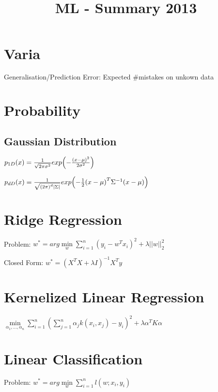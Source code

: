 \documentclass[11pt,twocolumn]{article}
\begin{document}
\title{ML - Summary 2013}



\section{Varia}

Generalisation/Prediction Error: Expected \#mistakes on unkown data


\section{Probability}

\subsection{Gaussian Distribution}

$p_{1D}(x) = {1 \over {\sqrt{2 \pi \sigma^2}}} exp{\left( -{{\left(x - \mu\right)^2} \over{2 \sigma^2}} \right)}$


$p_{dD}(x) = {1 \over {\sqrt{{(2 \pi)}^d |\Sigma|}}} exp{\left( -{ {1 \over 2}  {\left(x - \mu\right)^T} \Sigma^{-1} {\left(x - \mu\right)}}\right)}$



\section{Ridge Regression}

Problem: $ w^* =  arg \min \limits_w \sum \limits_{i=1}^n \left(y_i - w^Tx_i\right)^2 + \lambda ||w||_2^2$

Closed Form: $w^* = \left(X^T X + \lambda I \right)^{-1} X^T y$

\section{Kernelized Linear Regression}

$\min \limits_{\alpha_1,...,\alpha_n} \sum \limits_{i=1}^n\left( \sum \limits_{j=1}^n \alpha_j k(x_i,x_j) - y_i \right)^2 + \lambda \alpha^T K \alpha$

\section{Linear Classification}

Problem: $ w^* =  arg \min \limits_w \sum \limits_{i=1}^n l\left(w;x_i,y_i\right)$
\end{document}
